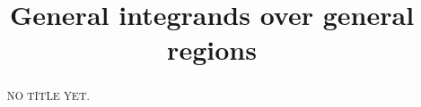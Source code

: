 \documentclass{ximera}
\title[Dig-In:]{General integrands over general regions}
\begin{document}
\begin{abstract}
NO TITLE YET.
\end{abstract}
\maketitle
\end{document}
